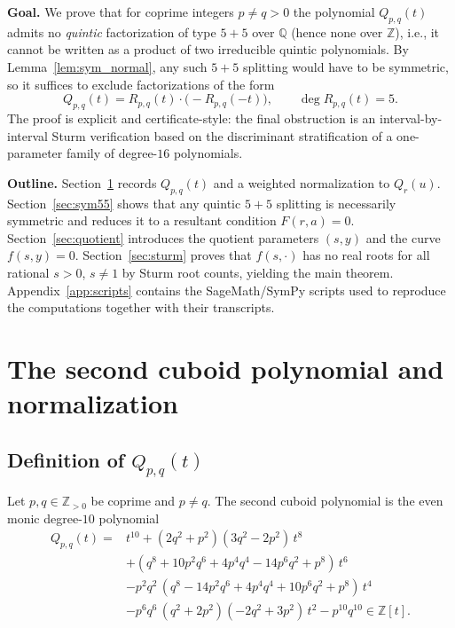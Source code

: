 \documentclass[12pt]{article}
\theoremstyle{remark}
\theoremstyle{definition}
\begin{document}
\medskip
\noindent\textbf{Goal.}
We prove that for coprime integers $p\neq q>0$ the polynomial $Q_{p,q}(t)$ admits no \emph{quintic} factorization of type $5+5$ over $\mathbb{Q}$ (hence none over $\mathbb{Z}$), i.e., it cannot be written as a product of two irreducible quintic polynomials.
By Lemma~\ref{lem:sym_normal}, any such $5+5$ splitting would have to be symmetric, so it suffices to exclude factorizations of the form
\[
Q_{p,q}(t)=R_{p,q}(t)\cdot \bigl(-R_{p,q}(-t)\bigr),\qquad \deg R_{p,q}(t)=5.
\]
The proof is explicit and certificate-style: the final obstruction is an interval-by-interval Sturm verification based on the discriminant stratification of a one-parameter family of degree-$16$ polynomials.

\medskip
\noindent\textbf{Outline.}
Section~\ref{sec:poly} records $Q_{p,q}(t)$ and a weighted normalization to $Q_r(u)$.
Section~\ref{sec:sym55} shows that any quintic $5+5$ splitting is necessarily symmetric and reduces it to a resultant condition $F(r,a)=0$.
Section~\ref{sec:quotient} introduces the quotient parameters $(s,y)$ and the curve $f(s,y)=0$.
Section~\ref{sec:sturm} proves that $f(s,\cdot)$ has no real roots for all rational $s>0$, $s\neq 1$ by Sturm root counts, yielding the main theorem.
Appendix~\ref{app:scripts} contains the SageMath/SymPy scripts used to reproduce the computations together with their transcripts.


\section{The second cuboid polynomial and normalization}\label{sec:poly}

\subsection{Definition of \texorpdfstring{$Q_{p,q}(t)$}{Qpq(t)}}
Let $p,q\in\mathbb{Z}_{>0}$ be coprime and $p\neq q$.
The second cuboid polynomial is the even monic degree-$10$ polynomial
\begin{align}
Q_{p,q}(t)
={}&t^{10} + (2 q^{2} + p^{2})(3 q^{2} - 2 p^{2})\, t^{8} \nonumber\\
&+ (q^{8} + 10 p^{2} q^{6} + 4 p^{4} q^{4} - 14 p^{6} q^{2} + p^{8})\, t^{6} \nonumber\\
&- p^{2} q^{2}\,(q^{8} - 14 p^{2} q^{6} + 4 p^{4} q^{4} + 10 p^{6} q^{2} + p^{8})\, t^{4} \nonumber\\
&- p^{6} q^{6}\,(q^{2} + 2 p^{2})(-2 q^{2} + 3 p^{2})\, t^{2}
- p^{10} q^{10}\in\mathbb{Z}[t].\label{eq:Qpq}
\end{align}
\end{document}
